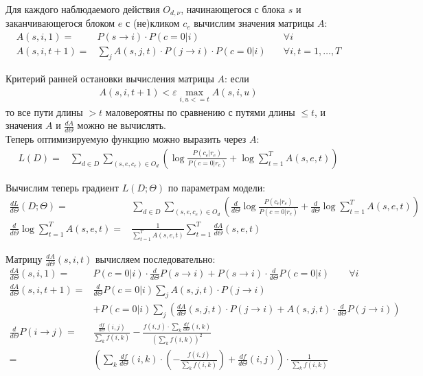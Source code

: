 \documentclass[12pt,a4paper]{article}
\begin{document}
Для каждого наблюдаемого действия $O_{d,\nu}$, начинающегося с блока $s$ и заканчивающегося блоком $e$ с (не)кликом $c_e$ вычислим значения матрицы $A$:
\begin{align}
A(s,i,1) =& P(s\to i) \cdot P(c=0 | i)              &\quad \forall i \\
A(s,i,t+1) =& \sum_j A(s,j,t) \cdot P(j\to i) \cdot P(c=0 | i)  &\quad \forall i, t=1,\ldots,T
\end{align}

Критерий ранней остановки вычисления матрицы $A$: если 
\begin{align}
A(s,i,t+1) < \varepsilon \max_{i,u<=t} A(s,i,u)
\end{align}
то все пути длины $>t$ маловероятны по сравнению с путями длины $\le t$, и значения $A$ и $\frac{dA}{d\Theta}$ можно не вычислять.\\


Теперь оптимизируемую функцию можно выразить через $A$:
\begin{align}
L(D) = & \sum_{d \in D} \sum_{(s,e,c_e) \in O_d}
  \left(
    \log \frac{P(c_e | r_e)}{P(c=0 | r_e)} + \log \sum_{t=1}^T A(s, e, t)
  \right)
\end{align}

Вычислим теперь градиент $L(D;\Theta)$ по параметрам модели:
\begin{align}
\frac{dL}{d\Theta}(D;\Theta) = & \sum_{d \in D} \sum_{(s,e,c_e) \in O_d}
  \left(
    \frac{d}{d\Theta} \log \frac{P(c_e | r_e)}{P(c=0 | r_e)}
    + \frac{d}{d\Theta} \log \sum_{t=1}^T A(s, e, t)
  \right) \\
\frac{d}{d\Theta} \log \sum_{t=1}^T A(s, e, t) = &
  \frac{1}{\sum_{t=1}^T A(s, e, t)}
  \sum_{t=1}^T \frac{dA}{d\Theta}(s, e, t)
\end{align}

Матрицу $\frac{dA}{d\Theta}(s, i, t)$ вычисляем последовательно:
\begin{align*}
\frac{dA}{d\Theta}(s,i,1) =& P(c=0 | i) \cdot \frac{d}{d\Theta}P(s\to i) + P(s\to i) \cdot \frac{d}{d\Theta} P(c=0|i) \qquad \forall i
\\
\frac{dA}{d\Theta}(s,i,t+1) =&
  \frac{d}{d\Theta} P(c=0|i) \sum_j A(s,j,t) \cdot P(j\to i)
  \\ & +
  P(c=0|i) \sum_j \left( \frac{dA}{d\Theta}(s,j,t) \cdot P(j\to i)
                       + A(s,j,t) \cdot \frac{d}{d\Theta} P(j\to i) \right)
\\
\frac{d}{d\Theta} P(i \to j) = &
  \frac{ \frac{df}{d\Theta}(i, j) }{ \sum_k f(i, k) }
    -
  \frac{ f(i, j) \cdot \sum_k \frac{df}{d\Theta}(i, k) }{
    \left( \sum_k f(i, k) \right)^2
    } 
  \\
  =& \left(
      \sum_k \frac{df}{d\Theta}(i, k) 
        \cdot \left(
          -\frac{ f(i, j) }{ \sum_k f(i, k) } \right)
      + \frac{df}{d\Theta}(i, j) 
     \right)
     \cdot
     \frac{1}{ \sum_k f(i, k) }
\end{align*}
\end{document}

